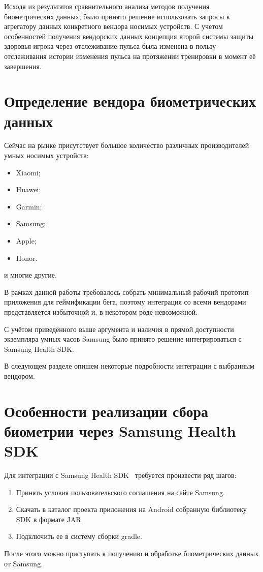Исходя из результатов сравнительного анализа методов получения биометрических данных, было принято решение использовать запросы к агрегатору данных конкретного вендора носимых устройств.
С учетом особенностей получения вендорских данных концепция второй системы защиты здоровья игрока через отслеживание пульса была изменена в пользу отслеживания истории изменения пульса на протяжении тренировки в момент её завершения.

\section{Определение вендора биометрических данных}
Сейчас на рынке присутствует большое количество различных производителей умных носимых устройств:
\begin{multicols}{2}
\begin{itemize}
	\item Xiaomi;
	\item Huawei;
	\item Garmin;
	\item Samsung;
	\item Apple;
	\item Honor.
\end{itemize}
\end{multicols}

и многие другие.


В рамках данной работы требовалось собрать минимальный рабочий прототип приложения для геймификации бега, поэтому интеграция со всеми вендорами представляется избыточной и, в некотором роде невозможной. 

С учётом приведённого выше аргумента и наличия в прямой доступности экземпляра умных часов Samsung было принято решение интегрироваться с Samsung Health SDK. 

В следующем разделе опишем некоторые подробности интеграции с выбранным вендором.

\section{Особенности реализации сбора биометрии через Samsung Health SDK}
Для интеграции с Samsung Health SDK~\autocite{shsdk_intro} требуется произвести ряд шагов:
\begin{enumerate}
	\item Принять условия пользовательского соглашения на сайте Samsung.
	\item Скачать в каталог проекта приложения на Android собранную библиотеку SDK в формате JAR.
	\item Подключить ее в систему сборки gradle.
\end{enumerate}
\smallskip
После этого можно приступать к получению и обработке биометрических данных от Samsung.

